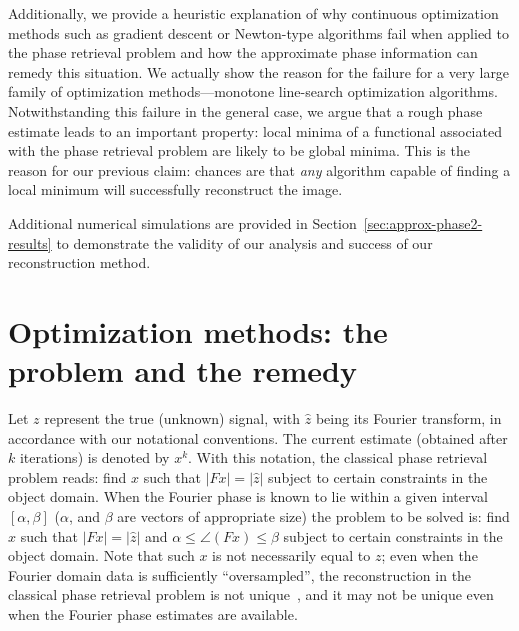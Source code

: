 Additionally, we provide a heuristic explanation of why continuous
optimization methods such as gradient descent or Newton-type algorithms
fail when applied to the phase retrieval problem and how the
approximate phase information can remedy this situation. We actually
show the reason for the failure for a very large family of optimization
methods---monotone line-search optimization algorithms.
Notwithstanding this failure in the general case, we argue that a
rough phase estimate leads to an important property: local minima of a
functional associated with the phase retrieval problem are likely to
be global minima. This is the reason for our previous claim: chances
are that \textit{any} algorithm capable of finding a local minimum
will successfully reconstruct the image.

Additional numerical simulations are provided in
Section~\ref{sec:approx-phase2-results} to demonstrate the validity of our analysis
and success of our reconstruction method.




\section{Optimization methods: the problem and the remedy}
\label{sec:optim-meth-probl}
Let  $z$ represent the true (unknown) signal, with
$\hat{z}$ being its Fourier transform, in accordance with our
notational conventions. The current estimate (obtained after $k$
iterations) is denoted by $x^{k}$. With this notation, the
classical phase retrieval problem reads: find $x$ such that
$|Fx|=|\hat{z}|$ subject to certain constraints in the object
domain. When the Fourier phase is known to lie within a given interval
$[\alpha,\beta]$ ($\alpha$, and $\beta$ are vectors of appropriate
size) the problem to be solved is: find $x$ such that $|Fx| =
|\hat{z}|$ and $\alpha \leq \angle(Fx) \leq \beta$ subject to certain
constraints in the object domain. Note that such $x$ is not
necessarily equal to $z$; even when the Fourier domain data is
sufficiently ``oversampled'', the reconstruction in the classical
phase retrieval problem is not
unique~, and it may not be unique
even when the Fourier phase estimates are available. 

